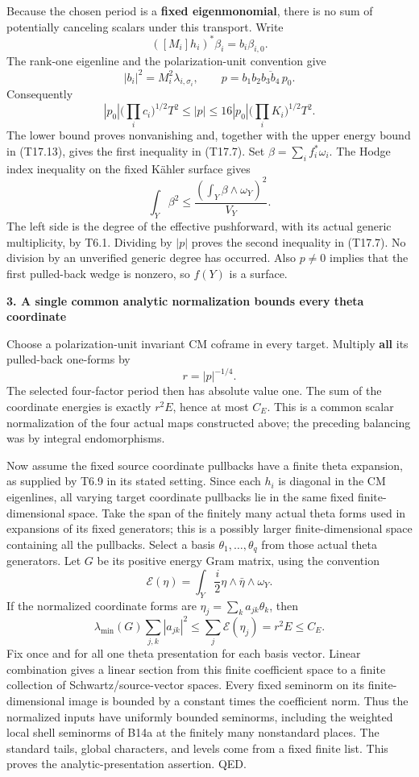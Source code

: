 Because the chosen period is a \textbf{fixed eigenmonomial}, there is no sum of potentially canceling scalars under this transport. Write \[
([M_i]h_i)^*\beta_i=b_i\beta_{i,0}.
\] The rank-one eigenline and the polarization-unit convention give \[
|b_i|^2=M_i^2\lambda_{i,\sigma_i},\qquad
p=b_1b_2\overline{b_3b_4}\,p_0.
\tag{T17.14}
\] Consequently \[
|p_0|\bigl(\prod_i c_i\bigr)^{1/2}T^2
\le |p|
\le16|p_0|\bigl(\prod_iK_i\bigr)^{1/2}T^2.
\tag{T17.15}
\] The lower bound proves nonvanishing and, together with the upper energy bound in (T17.13), gives the first inequality in (T17.7). Set \(\beta=\sum_i f_i^*\omega_i\). The Hodge index inequality on the fixed Kähler surface gives \[
\int_Y\beta^2\le\frac{(\int_Y\beta\wedge\omega_Y)^2}{V_Y}.
\] The left side is the degree of the effective pushforward, with its actual generic multiplicity, by T6.1. Dividing by \(|p|\) proves the second inequality in (T17.7). No division by an unverified generic degree has occurred. Also \(p\ne0\) implies that the first pulled-back wedge is nonzero, so \(f(Y)\) is a surface.

\textbf{3. A single common analytic normalization bounds every theta coordinate}

Choose a polarization-unit invariant CM coframe in every target. Multiply \textbf{all} its pulled-back one-forms by \[
r=|p|^{-1/4}.
\] The selected four-factor period then has absolute value one. The sum of the coordinate energies is exactly \(r^2E\), hence at most \(C_E\). This is a common scalar normalization of the four actual maps constructed above; the preceding balancing was by integral endomorphisms.

Now assume the fixed source coordinate pullbacks have a finite theta expansion, as supplied by T6.9 in its stated setting. Since each \(h_i\) is diagonal in the CM eigenlines, all varying target coordinate pullbacks lie in the same fixed finite-dimensional space. Take the span of the finitely many actual theta forms used in expansions of its fixed generators; this is a possibly larger finite-dimensional space containing all the pullbacks. Select a basis \(\theta_1,\ldots,\theta_q\) from those actual theta generators. Let \(G\) be its positive energy Gram matrix, using the convention \[
\mathcal E(\eta)=\int_Y\frac i2\eta\wedge\bar\eta\wedge\omega_Y.
\] If the normalized coordinate forms are \(\eta_j=\sum_k a_{jk}\theta_k\), then \[
\lambda_{\min}(G)\sum_{j,k}|a_{jk}|^2
\le\sum_j\mathcal E(\eta_j)
=r^2E\le C_E.
\tag{T17.16}
\] Fix once and for all one theta presentation for each basis vector. Linear combination gives a linear section from this finite coefficient space to a finite collection of Schwartz/source-vector spaces. Every fixed seminorm on its finite-dimensional image is bounded by a constant times the coefficient norm. Thus the normalized inputs have uniformly bounded seminorms, including the weighted local shell seminorms of B14a at the finitely many nonstandard places. The standard tails, global characters, and levels come from a fixed finite list. This proves the analytic-presentation assertion. QED.

